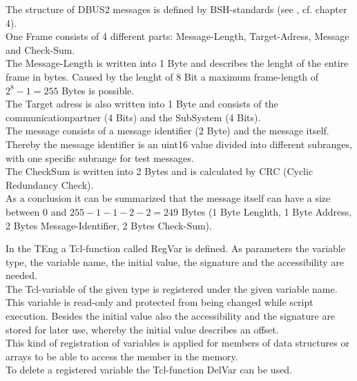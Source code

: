 The structure of DBUS2 messages is defined by BSH-standards (see \cite{dbus}, cf. chapter 4).
\\
One Frame consists of 4 different parts: Message-Length, Target-Adress, Message and Check-Sum.
\\
The Message-Length is written into 1 Byte and describes the lenght of the entire frame in bytes. Caused by the lenght of 8 Bit a maximum frame-length of \(2^{8}-1 = 255\) Bytes is possible.
\\
The Target adress is also written into 1 Byte and consists of the communicationpartner (4 Bits) and the SubSystem (4 Bits).
\\
The message consists of a message identifier (2 Byte) and the message itself. 
Thereby the message identifier is an uint16 value divided into different subranges, with one specific subrange for test messages. 
\\
The CheckSum is written into 2 Bytes and is calculated by CRC (Cyclic Redundancy Check).
\\
As a conclusion it can be summarized that the message itself can have a size between 0 and \(255-1-1-2-2 = 249\) Bytes (1 Byte Lenghth, 1 Byte Address, 2 Bytes Message-Identifier, 2 Bytes Check-Sum).













In the TEng a Tcl-function called RegVar is defined.
As parameters the variable type, the variable name, the initial value, the signature and the accessibility are needed.
\\
The Tcl-variable of the given type is registered under the given variable name. This variable is read-only and protected from being changed while script execution. Besides the initial value also the accessibility and the signature are stored for later use, whereby the initial value describes an offset.
\\
This kind of registration of variables is applied for members of data structures or arrays to be able to access the member in the memory.
\\
To delete a registered variable the Tcl-function DelVar can be used.








